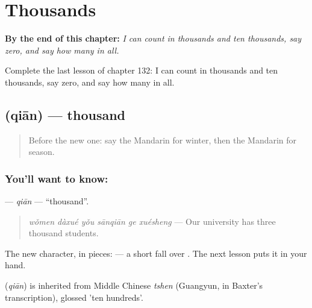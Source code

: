 
\chapter{Thousands}
\label{ch:zh-thousands}

\begin{chapteropening}
\textbf{By the end of this chapter:} \emph{I can count in thousands and ten thousands, say zero, and say how many in all.}

Complete the last lesson of chapter 132: I can count in thousands and ten thousands, say zero, and say how many in all.
\end{chapteropening}

\section[\texorpdfstring{\zh{千} (qiān)}{千 (qiān)}]{ (qiān) — thousand}

\label{lesson:ZH-C132-qian}



\begin{quote}
Before the new one: say the Mandarin for winter, then the Mandarin for season.
\end{quote}

\subsection*{You'll want to know: }
\textbf{} — \emph{qiān} — \textquotedblleft{}thousand\textquotedblright{}.

\begin{quote}
\textbf{} \emph{wǒmen dàxué yǒu sānqiān ge xuésheng} — Our university has three thousand students.
\end{quote}

The new character, in pieces:  — a short fall over . The next lesson puts it in your hand.

\begin{cousinweb}
\textbf{} (\emph{qiān}) is inherited from Middle Chinese \emph{tshen} (Guangyun, in Baxter's transcription), glossed 'ten hundreds'.
\end{cousinweb}

